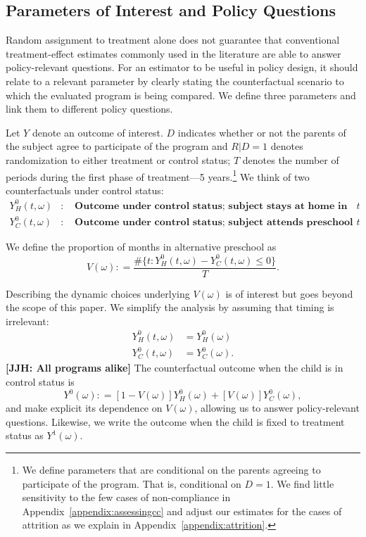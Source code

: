 \subsection{Parameters of Interest and Policy Questions} \label{section:methodsquestions}

Random assignment to treatment alone does not guarantee that conventional treatment-effect estimates commonly used in the literature are able to answer policy-relevant questions. For an estimator to be useful in policy design, it should relate to a relevant parameter by clearly stating the counterfactual scenario to which the evaluated program is being compared. We define three parameters and link them to different policy questions.

Let $Y$ denote an outcome of interest. $D$ indicates whether or not the parents of the subject agree to participate of the program and $R | D = 1$ denotes randomization to either treatment or control status; $T$ denotes the number of periods during the first phase of treatment---5 years.\footnote{We define parameters that are conditional on the parents agreeing to participate of the program. That is, conditional on $D = 1$. We find little sensitivity to the few cases of non-compliance in Appendix~\ref{appendix:assessingcc} and adjust our estimates for the cases of attrition as we explain in Appendix~\ref{appendix:attrition}.} We think of two counterfactuals under control status:
\begin{eqnarray}
Y_H^0 \left( t, \omega \right) &:& \textbf{ Outcome under control status; subject stays at home in period $t$} \nonumber \\
Y_C^0 \left( t, \omega \right) &:& \textbf{ Outcome under control status; subject attends preschool in period $t$}  \nonumber
\end{eqnarray}

We define the proportion of months in alternative preschool as
\begin{equation}
V \left ( \omega \right) : = \frac{\# \{ t: Y_H^0 \left( t, \omega \right) - Y_C^0 \left( t, \omega \right) \leq 0 \} }{T}.
\end{equation}

Describing the dynamic choices underlying $V \left ( \omega \right)$ is of interest but goes beyond the scope of this paper. We simplify the analysis by assuming that timing is irrelevant:
\begin{align}
Y_H^0 \left( t, \omega \right) &= Y_H^0 \left( \omega \right) \nonumber \\
Y_C^0 \left( t, \omega \right) &= Y_C^0 \left( \omega \right).
\end{align}
\textbf{[JJH: All programs alike]} The counterfactual outcome when the child is in control status is
\begin{equation}
Y^0 \left( \omega \right) : = \left[ 1 - V \left( \omega \right) \right] Y_H^0 \left( \omega \right) + \left[ V \left( \omega \right) \right] Y_C^0 \left( \omega \right),
\end{equation}
and make explicit its dependence on $V \left( \omega \right)$, allowing us to answer policy-relevant questions. Likewise, we write the outcome when the child is fixed to treatment status as $Y^1 \left( \omega \right)$.

